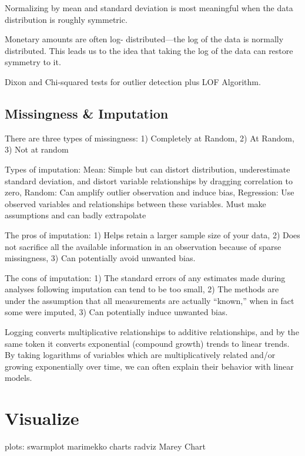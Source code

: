 \documentclass[]{book}
\begin{document}
Normalizing by mean and standard deviation is most meaningful when the data distribution is roughly symmetric.

Monetary amounts are often log- distributed---the log of the data is normally distributed. This leads us to the idea that taking the log of the data can restore symmetry to it.

Dixon and Chi-squared tests for outlier detection plus LOF Algorithm.

\hypertarget{missingness-imputation}{%
\subsection{Missingness \& Imputation}\label{missingness-imputation}}

There are three types of missingness: 1) Completely at Random, 2) At Random, 3) Not at random

Types of imputation: Mean: Simple but can distort distribution, underestimate standard deviation, and distort variable relationships by dragging correlation to zero, Random: Can amplify outlier observation and induce bias, Regression: Use observed variables and relationships between these variables. Must make assumptions and can badly extrapolate

The pros of imputation: 1) Helps retain a larger sample size of your data, 2) Does not sacrifice all the available information in an observation because of sparse missingness, 3) Can potentially avoid unwanted bias.

The cons of imputation: 1) The standard errors of any estimates made during analyses following imputation can tend to be too small, 2) The methods are under the assumption that all measurements are actually ``known,'' when in fact some were imputed, 3) Can potentially induce unwanted bias.

Logging converts multiplicative relationships to additive relationships, and by the same token it converts exponential (compound growth) trends to linear trends. By taking logarithms of variables which are multiplicatively related and/or growing exponentially over time, we can often explain their behavior with linear models.

\hypertarget{visualize}{%
\section{Visualize}\label{visualize}}

plots: swarmplot \textbar{} marimekko charts \textbar{} radviz \textbar{} Marey Chart
\end{document}
